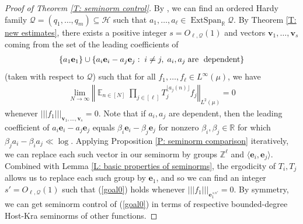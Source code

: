 \documentclass[11pt]{amsart}
\theoremstyle{definition}
\DeclareMathOperator*{\E}{\mathbb{E}}
\newcommand{\R}{{\mathbb R}}
\newcommand{\Z}{{\mathbb Z}}
\newcommand{\CH}{{\mathcal H}}
\newcommand{\CQ}{{\mathcal Q}}
\newcommand{\be}{{\mathbf{e}}}
\newcommand{\bv}{{\mathbf{v}}}
\newcommand{\norm}[1]{\left\Vert #1\right\Vert}
\newcommand{\nnorm}[1]{\lvert\!|\!| #1|\!|\!\rvert}
\newcommand{\1}{{\mathbf{1}}}
\DeclareMathOperator{\extspan}{ExtSpan}
\newcommand{\sfloor}[1]{{\lfloor #1 \rfloor}}
\begin{document}
\begin{proof}[Proof of Theorem \ref{T: seminorm control}]
By \cite[Lemma A.3]{R22}, we can find an ordered Hardy family $\CQ = (q_1, \ldots, q_m)\subseteq\CH$ such that $a_{1},\dots,a_{\ell}\in\extspan_\R\CQ$.
By Theorem \ref{T: new estimates}, there exists a positive integer $s=O_{\ell, \CQ}(1)$ and vectors $\bv_{1},\dots,\bv_{s}$ coming from the set of the leading coefficients of 
        \begin{align*}
            \{a_1 \be_1\}\cup\{a_i \be_i - a_j \be_j:\; i\neq j,\; a_i, a_j\; \textrm{are\; dependent}\}
        \end{align*}
        (taken with respect to $\CQ$) such that for all $f_{1},\dots,f_{\ell}\in L^{\infty}(\mu)$, we have
\begin{align}\label{goal0}
                  \lim_{N\to\infty} %
         \norm{\E_{n\in [N]} 
         \prod_{j\in[\ell]}  T_{j}^{\sfloor{a_{j}(n)}} f_{j}}_{L^2(\mu)}=0
    \end{align}
    whenever $\nnorm{f_1}_{\bv_{1},\dots,\bv_{s}}=0$. Note that if $a_i, a_j$ are dependent, then the leading coefficient of $a_i \be_i - a_j \be_j$ equals $\beta_i \be_i - \beta_j \be_j$ for nonzero $\beta_i, \beta_j\in\R$ for which $\beta_j a_i - \beta_i a_j\ll\log$. Applying Proposition \ref{P: seminorm comparison} iteratively, we can replace each such vector in our seminorm by groups $\Z^\ell$ and $\langle \be_i, \be_j\rangle$. Combined with Lemma \ref{L: basic properties of seminorms}, the ergodicity of $T_i, T_j$ allows us to replace each such group by $\be_1$, and so we can find an integer $s'=O_{\ell, \CQ}(1)$ such that (\ref{goal0}) holds whenever $\nnorm{f_1}_{\be_1^{\times s'}}=0$. By symmetry, we can get seminorm control of (\ref{goal0}) in terms of respective bounded-degree Host-Kra seminorms of other functions. 

\end{proof}
\end{document}
